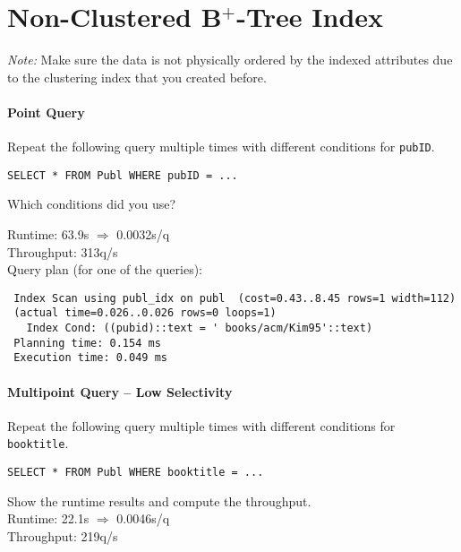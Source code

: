 \documentclass[11pt]{scrartcl}
\begin{document}
\section{Non-Clustered B$^+$-Tree Index}

\noindent \emph{Note:} Make sure the data is not physically ordered by
the indexed attributes due to the clustering index that you created
before.

\paragraph{Point Query}

Repeat the following query multiple times with different conditions for {\tt pubID}.

{\small
\begin{verbatim}
SELECT * FROM Publ WHERE pubID = ...
\end{verbatim}
}

\noindent
Which conditions did you use?\\
\condA

\smallskip\noindent
Runtime: 63.9s $\Rightarrow$ 0.0032s/q\\
Throughput: 313q/s\\

\smallskip\noindent
Query plan (for one of the queries):
{\small
\begin{verbatim}
 Index Scan using publ_idx on publ  (cost=0.43..8.45 rows=1 width=112)
 (actual time=0.026..0.026 rows=0 loops=1)
   Index Cond: ((pubid)::text = ' books/acm/Kim95'::text)
 Planning time: 0.154 ms
 Execution time: 0.049 ms
\end{verbatim}
}


\paragraph{Multipoint Query -- Low Selectivity}

Repeat the following query multiple times with different conditions for {\tt booktitle}.

{\small
\begin{verbatim}
SELECT * FROM Publ WHERE booktitle = ...
\end{verbatim}
}

\noindent
\condB

\smallskip\noindent
Show the runtime results and compute the throughput.\\
Runtime: 22.1s $\Rightarrow$ 0.0046s/q\\
Throughput: 219q/s\\
\end{document}
